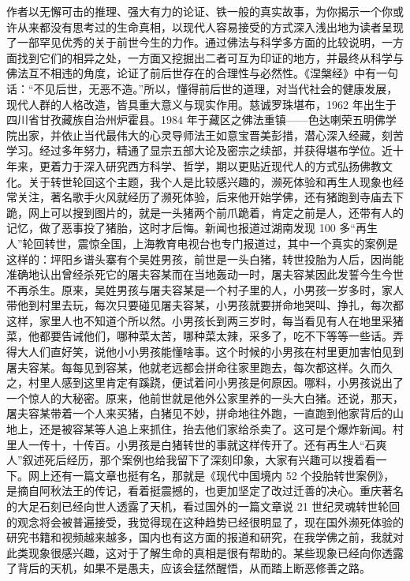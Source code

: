 \begin{book}
    作者以无懈可击的推理、强大有力的论证、铁一般的真实故事，为你揭示一个你或许从来都没有思考过的生命真相，以现代人容易接受的方式深入浅出地为读者呈现了一部罕见优秀的关于前世今生的力作。通过佛法与科学多方面的比较说明，一方面找到它们的相异之处，一方面又挖掘出二者可互为印证的地方，并最终从科学与佛法互不相违的角度，论证了前后世存在的合理性与必然性。《涅槃经》中有一句话：“不见后世，无恶不造。”所以，懂得前后世的道理，对当代社会的健康发展，现代人群的人格改造，皆具重大意义与现实作用。慈诚罗珠堪布，1962 年出生于四川省甘孜藏族自治州炉霍县。1984 年于藏区之佛法重镇——色达喇荣五明佛学院出家，并依止当代最伟大的心灵导师法王如意宝晋美彭措，潜心深入经藏，刻苦学习。经过多年努力，精通了显宗五部大论及密宗之续部，并获得堪布学位。近十年来，更着力于深入研究西方科学、哲学，期以更贴近现代人的方式弘扬佛教文化。关于转世轮回这个主题，我个人是比较感兴趣的，濒死体验和再生人现象也经常关注，著名歌手火风就经历了濒死体验，后来他开始学佛，还有猪跑到寺庙去下跪，网上可以搜到图片的，就是一头猪两个前爪跪着，肯定之前是人，还带有人的记忆，做了恶事投了猪胎，这时才后悔。新闻也报道过湖南发现 100 多“再生人”轮回转世，震惊全国，上海教育电视台也专门报道过，其中一个真实的案例是这样的：坪阳乡谱头寨有个吴姓男孩，前世是一头白猪，转世投胎为人后，因尚能准确地认出曾经杀死它的屠夫容某而在当地轰动一时，屠夫容某因此发誓今生今世不再杀生。原来，吴姓男孩与屠夫容某是一个村子里的人，小男孩一岁多时，家人带他到村里去玩，每次只要碰见屠夫容某，小男孩就要拼命地哭叫、挣扎，每次都这样，家里人也不知道个所以然。小男孩长到两三岁时，每当看见有人在地里采猪菜，他都要告诫他们，哪种菜太苦，哪种菜太辣，采多了，吃不下等等一些话。弄得大人们直好笑，说他小小男孩能懂啥事。这个时候的小男孩在村里更加害怕见到屠夫容某。每每见到容某，他就老远都会拼命往家里跑去，每次都这样。久而久之，村里人感到这里肯定有蹊跷，便试着问小男孩是何原因。哪料，小男孩说出了一个惊人的大秘密。原来，他前世就是他外公家里养的一头大白猪。还说，那天，屠夫容某带着一个人来买猪，白猪见不妙，拼命地往外跑，一直跑到他家背后的山地上，还是被容某等人追上来抓住，抬去他们家给杀卖了。这可是个爆炸新闻。村里人一传十，十传百。小男孩是白猪转世的事就这样传开了。还有再生人“石爽人”叙述死后经历，那个案例也给我留下了深刻印象，大家有兴趣可以搜着看一下。网上还有一篇文章也挺有名，那就是《现代中国境内 52 个投胎转世案例》，是摘自阿秋法王的传记，看着挺震撼的，也更加坚定了改过迁善的决心。重庆著名的大足石刻已经向世人透露了天机，看过国外的一篇文章说 21 世纪灵魂转世轮回的观念将会被普遍接受，我觉得现在这种趋势已经很明显了，现在国外濒死体验的研究书籍和视频越来越多，国内也有这方面的报道和研究，在我学佛之前，我就对此类现象很感兴趣，这对于了解生命的真相是很有帮助的。某些现象已经向你透露了背后的天机，如果不是愚夫，应该会猛然醒悟，从而踏上断恶修善之路。
\end{book}

